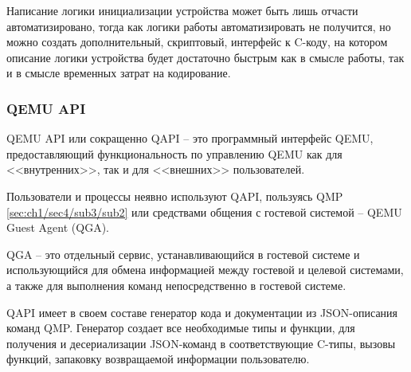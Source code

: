 Написание логики инициализации устройства может быть лишь отчасти автоматизировано, тогда как
логики работы автоматизировать не получится, но можно создать дополнительный, скриптовый,
интерфейс к C-коду, на котором описание логики устройства будет достаточно быстрым как
в смысле работы, так и в смысле временных затрат на кодирование.


\subsubsection{QEMU API}\label{sec:ch1/sec4/sub3/sub5}

QEMU API или сокращенно QAPI -- это программный интерфейс QEMU, предоставляющий функциональность по
управлению QEMU как для <<внутренних>>, так и для <<внешних>> пользователей.

Пользователи и процессы неявно используют QAPI, пользуясь QMP \ref{sec:ch1/sec4/sub3/sub2} или средствами
общения с гостевой системой -- QEMU Guest Agent (QGA).

QGA -- это отдельный сервис, устанавливающийся в гостевой системе и использующийся для обмена информацией
между гостевой и целевой системами, а также для выполнения команд непосредственно в гостевой системе.

QAPI имеет в своем составе генератор кода и документации из JSON-описания команд QMP.
Генератор создает все необходимые типы и функции, для получения и десериализации JSON-команд в соответствующие
C-типы, вызовы функций, запаковку возвращаемой информации пользователю.
